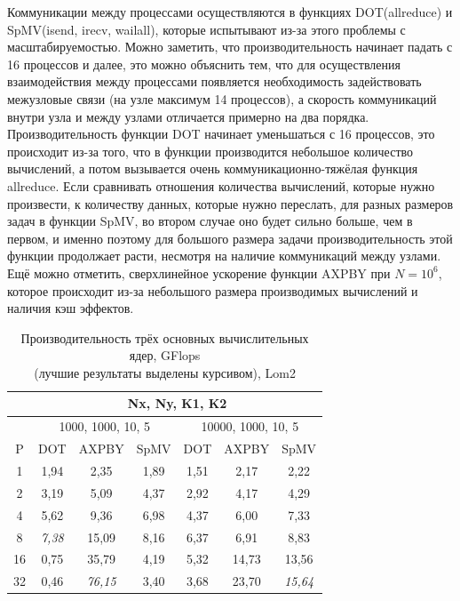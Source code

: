 		Коммуникации между процессами осуществляются в функциях DOT(allreduce) и SpMV(isend, irecv, wailall), которые испытывают из-за этого проблемы с масштабируемостью. Можно заметить, что производительность начинает падать с 16 процессов и далее, это можно объяснить тем, что для осуществления взаимодействия между процессами появляется необходимость задействовать межузловые связи (на узле максимум 14 процессов), а скорость коммуникаций внутри узла и между узлами отличается примерно на два порядка. Производительность функции DOT начинает уменьшаться с 16 процессов, это происходит из-за того, что в функции производится небольшое количество вычислений, а потом вызывается очень коммуникационно-тяжёлая функция allreduce. Если сравнивать отношения количества вычислений, которые нужно произвести, к количеству данных, которые нужно переслать, для разных размеров задач в функции SpMV, во втором случае оно будет сильно больше, чем в первом, и именно поэтому для большого размера задачи производительность этой функции продолжает расти, несмотря на наличие коммуникаций между узлами. Ещё можно отметить, сверхлинейное ускорение функции AXPBY при \(N = 10^6\), которое происходит из-за небольшого размера производимых вычислений и наличия кэш эффектов.

		\begin{table}[H]
			\begin{tabular}{|c||c|c|c|c|c|c|}
				\hline
				& \multicolumn{6}{|c|}{Nx, Ny, K1, K2} \\ \hline
				   & \multicolumn{3}{c|}{1000, 1000, 10, 5} & \multicolumn{3}{c|}{10000, 1000, 10, 5} \\ \hline
				P  & DOT          & AXPBY        &SpMV  & DOT &AXPBY&SpMV \\ \hline
				1  & 1,94         &2,35          &1,89  & 1,51&2,17 &2,22 \\ \hline
				2  & 3,19         &5,09          &4,37  & 2,92&4,17 &4,29 \\ \hline
				4  & 5,62         &9,36          &6,98  & 4,37&6,00 &7,33 \\ \hline
				8  & \textit{7,38}&15,09         &8,16  & 6,37&6,91 &8,83 \\ \hline
				16 & 0,75         &35,79         &4,19  & 5,32&14,73&13,56 \\ \hline
				32 & 0,46         &\textit{76,15}&3,40  & 3,68&23,70&\textit{15,64} \\ \hline
			\end{tabular}
			\caption{Производительность трёх основных вычислительных ядер, GFlops\\(лучшие результаты выделены курсивом), Lom2}
			\label{real_perf}
		\end{table}
		

\clearpage
